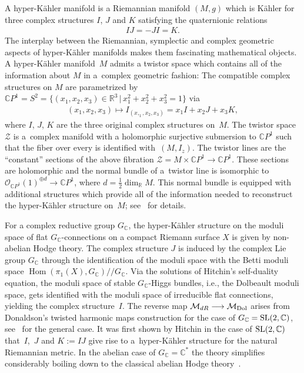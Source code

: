 \documentclass[pdftex]{sigma}
\numberwithin{equation}{section}
\begin{document}
A hyper-K\"ahler manifold is a Riemannian manifold $(M, g)$ which is K\"ahler for three complex structures $I$, $J$ and $K$ satisfying the quaternionic relations
\begin{gather*}IJ = -JI = K .\end{gather*} The interplay between the Riemannian, symplectic and complex geometric aspects of hyper-K\"ahler manifolds makes them fascinating mathematical objects. A hyper-K\"ahler mani\-fold~$M$ admits a twistor space which contains all of the information about $M$ in a~complex geometric fashion: The compatible complex structures on $M$ are parametrized by $\mathbb CP^1 = S^2 = \big\{(x_1, x_2, x_3) \in {\mathbb R}^3 \,|\, x^2_1+x^2_2+x^2_3 = 1\big\}$ via
\begin{gather*}(x_1, x_2, x_3) \longmapsto I_{(x,_1,x_2,x_3)} = x_1 I+x_2 J+x_3 K ,\end{gather*}
where $I$, $J$, $K$ are the three original complex structures on~$M$. The twistor space $\mathcal Z$ is a~complex manifold with a holomorphic surjective submersion to $\mathbb CP^1$ such that the f\/iber over every  is identif\/ied with~$(M, I_z)$. The twistor lines are the ``constant'' sections of the above f\/ibration ${\mathcal Z} = M\times\mathbb CP^1 \longrightarrow {\mathbb C} P^1$. These sections are holomorphic and the normal bundle of a~twistor line is isomorphic to ${\mathcal O}_{\mathbb CP^1}(1)^{\oplus d} \longrightarrow \mathbb CP^1$, where $d = \frac{1}{2}\dim_{\mathbb R}M$. This normal bundle is equipped with additional structures which provide all of the information needed to reconstruct the hyper-K\"ahler structure on~$M$; see~\cite{HKLR} for details.

For a complex reductive group $G_{\mathbb C}$, the hyper-K\"ahler structure on the moduli space of f\/lat $G_{\mathbb C}$-connections on a compact Riemann surface $X$ is given by non-abelian Hodge theory. The complex structure $J$ is induced by the complex Lie group $G_{\mathbb C}$ through the identif\/ication of the moduli space with the Betti moduli space $\operatorname{Hom}(\pi_1(X), G_{\mathbb C})/\!\!/G_{\mathbb C}$. Via the solutions of Hitchin's self-duality equation, the moduli space of stable $G_{\mathbb C}$-Higgs bundles, i.e., the Dolbeault moduli space, gets identif\/ied with the moduli space of irreducible f\/lat connections, yielding the complex structure~$I$. The reverse map ${\mathcal M}_{dR}  \longrightarrow \mathcal M_{\rm Dol}$ arises from Donaldson's twisted harmonic maps construction \cite{Do} for the case of $G_{\mathbb C}={\rm SL }(2,\mathbb C)$, see~\cite{Co} for the general case. It was f\/irst shown by Hitchin in the case of ${\rm SL}(2,\mathbb C)$ that~$I$,~$J$ and $K := IJ$ give rise to a~hyper-K\"ahler structure for the natural Riemannian metric. In the abelian case of $G_{\mathbb C} = \mathbb C^*$ the theory simplif\/ies considerably boiling down to the classical abelian Hodge theory~\cite{GX}.
\end{document}
